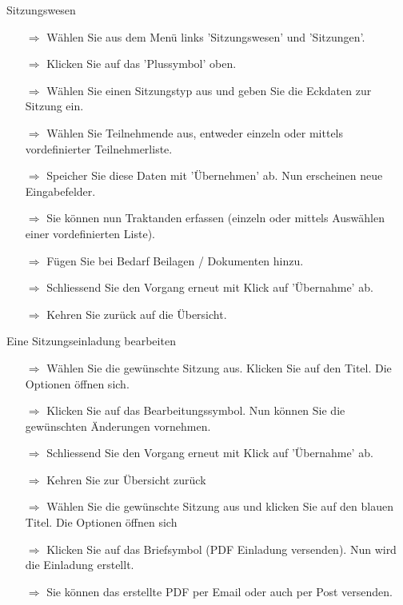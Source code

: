 \documentclass[twocolumn]{article}
\begin{document}
	
	\begin{beamerlikethm}{Sitzungswesen}
\begin{itemize}
  \item[$\Longrightarrow$] Wählen Sie aus dem Menü links 'Sitzungswesen' und 'Sitzungen'.
  \item[$\Longrightarrow$] Klicken Sie auf das 'Plussymbol' oben.
  \item[$\Longrightarrow$] Wählen Sie einen Sitzungstyp aus und geben Sie die Eckdaten zur Sitzung ein.
	\item[$\Longrightarrow$] Wählen Sie Teilnehmende aus, entweder einzeln oder mittels vordefinierter Teilnehmerliste.
  \item[$\Longrightarrow$] Speicher Sie diese Daten mit 'Übernehmen' ab. Nun erscheinen neue Eingabefelder.
  \item[$\Longrightarrow$] Sie können nun Traktanden erfassen (einzeln oder mittels Auswählen einer vordefinierten Liste).
  \item[$\Longrightarrow$] Fügen Sie bei Bedarf Beilagen / Dokumenten hinzu.
  \item[$\Longrightarrow$] Schliessend Sie den Vorgang erneut mit Klick auf 'Übernahme' ab.
  \item[$\Longrightarrow$] Kehren Sie zurück auf die Übersicht.
\end{itemize}
\end{beamerlikethm}



\begin{beamerlikethm}{Eine Sitzungseinladung bearbeiten}
\begin{itemize}
  \item[$\Longrightarrow$] Wählen Sie die gewünschte Sitzung aus. Klicken Sie auf den Titel. Die Optionen öffnen sich.
  \item[$\Longrightarrow$] Klicken Sie auf das Bearbeitungssymbol. Nun können Sie die gewünschten Änderungen vornehmen.
  \item[$\Longrightarrow$] Schliessend Sie den Vorgang erneut mit Klick auf 'Übernahme' ab.
\end{itemize}
\end{beamerlikethm}




\begin{tcolorbox}[colback=blue!5,colframe=blue!40!black,title=Einladung versenden]
\begin{itemize}
  \item[$\Longrightarrow$] Kehren Sie zur Übersicht zurück
  \item[$\Longrightarrow$] Wählen Sie die gewünschte Sitzung aus und klicken Sie auf den blauen Titel. Die Optionen öffnen sich
  \item[$\Longrightarrow$] Klicken Sie auf das Briefsymbol (PDF Einladung versenden). Nun wird die Einladung erstellt.
  \item[$\Longrightarrow$] Sie können das erstellte PDF per Email oder auch per Post versenden.
\end{itemize}
\end{tcolorbox}
\end{document}
